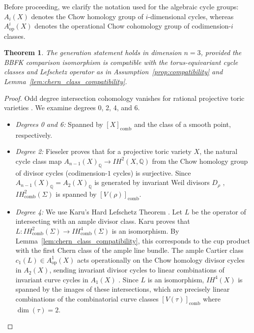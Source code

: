 \documentclass[12pt,reqno]{amsart}
\theoremstyle{plain}
\newtheorem{theorem}{Theorem}[section]
\theoremstyle{definition}
\newcommand{\IQ}{\mathbb{Q}}
\newcommand{\IHcomb}{IH_{\mathrm{comb}}}
\newcommand{\Chowh}[1]{A_{#1}}
\newcommand{\Chowop}[1]{A^{#1}_{\mathrm{op}}}
\begin{document}
	Before proceeding, we clarify the notation used for the algebraic cycle groups: $\Chowh{i}(X)$ denotes the Chow homology group of $i$-dimensional cycles, whereas $\Chowop{i}(X)$ denotes the operational Chow cohomology group of codimension-$i$ classes.
	
	\begin{theorem}
		\label{thm:dim3}
		The generation statement holds in dimension $n=3$, provided the BBFK comparison isomorphism is compatible with the torus-equivariant cycle classes and Lefschetz operator as in Assumption~\ref{prop:compatibility} and Lemma~\ref{lem:chern_class_compatibility}.
	\end{theorem}
	\begin{proof}
		Odd degree intersection cohomology vanishes for rational projective toric varieties \cite[Corollary 1.3]{Fieseler91}. We examine degrees 0, 2, 4, and 6.
		\begin{itemize}
			\item \emph{Degrees 0 and 6:} Spanned by $[X]_{\mathrm{comb}}$ and the class of a smooth point, respectively.
			\item \emph{Degree 2:} Fieseler \cite[Theorem 1.1]{Fieseler91} proves that for a projective toric variety $X$, the natural cycle class map $\Chowh{n-1}(X)_\IQ \to IH^2(X, \IQ)$ from the Chow homology group of divisor cycles (codimension-$1$ cycles) is surjective. Since $\Chowh{n-1}(X)_\IQ = \Chowh{2}(X)_\IQ$ is generated by invariant Weil divisors $D_\rho$ \cite{Fulton}, $\IHcomb^2(\Sigma)$ is spanned by $[V(\rho)]_{\mathrm{comb}}$.
			\item \emph{Degree 4:} We use Karu's Hard Lefschetz Theorem \cite{Karu}. Let $L$ be the operator of intersecting with an ample divisor class. Karu proves that $L: \IHcomb^2(\Sigma) \to \IHcomb^4(\Sigma)$ is an isomorphism. By Lemma~\ref{lem:chern_class_compatibility}, this corresponds to the cup product with the first Chern class of the ample line bundle. The ample Cartier class $c_1(L) \in \Chowop{1}(X)$ acts operationally on the Chow homology divisor cycles in $\Chowh{2}(X)$, sending invariant divisor cycles to linear combinations of invariant curve cycles in $\Chowh{1}(X)$ \cite[Section 2]{FS97}. Since $L$ is an isomorphism, $IH^4(X)$ is spanned by the images of these intersections, which are precisely linear combinations of the combinatorial curve classes $[V(\tau)]_{\mathrm{comb}}$ where $\dim(\tau)=2$.
		\end{itemize}
	\end{proof}
	
\end{document}
